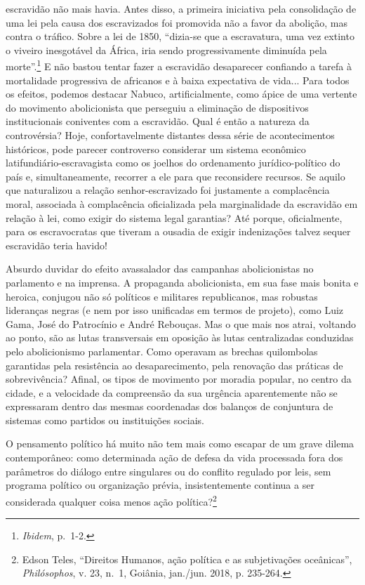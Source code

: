 escravidão não mais havia. Antes disso, a primeira iniciativa pela
consolidação de uma lei pela causa dos escravizados foi promovida não a
favor da abolição, mas contra o tráfico. Sobre a lei de 1850, ``dizia-se
que a escravatura, uma vez extinto o viveiro inesgotável da África, iria
sendo progressivamente diminuída pela morte''.\footnote{\emph{Ibidem},
  p.~1-2.} E não bastou tentar fazer a escravidão desaparecer confiando
a tarefa à mortalidade progressiva de africanos e à baixa expectativa de
vida... Para todos os efeitos, podemos destacar Nabuco, artificialmente,
como ápice de uma vertente do movimento abolicionista que perseguiu a
eliminação de dispositivos institucionais coniventes com a escravidão.
Qual é então a natureza da controvérsia? Hoje, confortavelmente
distantes dessa série de acontecimentos históricos, pode parecer
controverso considerar um sistema econômico latifundiário-escravagista
como os joelhos do ordenamento jurídico-político do país e,
simultaneamente, recorrer a ele para que reconsidere recursos. Se aquilo
que naturalizou a relação senhor-escravizado foi justamente a
complacência moral, associada à complacência oficializada pela
marginalidade da escravidão em relação à lei, como exigir do sistema
legal garantias? Até porque, oficialmente, para os escravocratas que
tiveram a ousadia de exigir indenizações talvez sequer escravidão teria
havido!

Absurdo duvidar do efeito avassalador das campanhas abolicionistas no
parlamento e na imprensa. A propaganda abolicionista, em sua fase mais
bonita e heroica, conjugou não só políticos e militares republicanos,
mas robustas lideranças negras (e nem por isso unificadas em termos de
projeto), como Luiz Gama, José do Patrocínio e André Rebouças. Mas o que
mais nos atrai, voltando ao ponto, são as lutas transversais em oposição
às lutas centralizadas conduzidas pelo abolicionismo parlamentar. Como
operavam as brechas quilombolas garantidas pela resistência ao
desaparecimento, pela renovação das práticas de sobrevivência? Afinal,
os tipos de movimento por moradia popular, no centro da cidade, e a
velocidade da compreensão da sua urgência aparentemente não se
expressaram dentro das mesmas coordenadas dos balanços de conjuntura de
sistemas como partidos ou instituições sociais.

O pensamento político há muito não tem mais como escapar de um grave
dilema contemporâneo: como determinada ação de defesa da vida processada
fora dos parâmetros do diálogo entre singulares ou do conflito regulado
por leis, sem programa político ou organização prévia, insistentemente
continua a ser considerada qualquer coisa menos ação política?\footnote{Edson
  Teles, ``Direitos Humanos, ação política e as subjetivações
  oceânicas'', \emph{Philósophos}, v. 23, n.~1, Goiânia, jan./jun. 2018,
  p. 235-264.}

